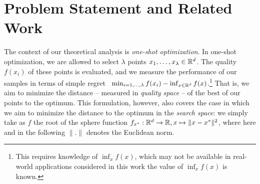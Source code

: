 \section{Problem Statement and Related Work}\label{statement}
\label{sec:basics}
The context of our {theoretical analysis} is \textit{one-shot optimization}. In one-shot optimization, we are allowed to select $\lambda$ points $x_1, \ldots, x_{\lambda} \in \mathbb{R}^d$. The quality $f(x_i)$ of these points is evaluated, and we measure the performance of our samples in terms of simple regret~\cite{bubeck2009pure} 
$\min_{i=1, \ldots,\lambda}f(x_i)-\inf_{x \in \mathbb{R}^d} f(x)$.\footnote{This requires knowledge of $\inf_{x} f(x)$, which may not be available in real-world  applications considered in this work the value of $\inf_x f(x)$ is known.} That is, we aim to minimize the distance -- measured in \textit{quality space} -- of the best of our points to the optimum. This formulation, however, also covers the case in which we aim to minimize the distance to the optimum in the \textit{search space}: we simply take as $f$ the root of the sphere function $f_{x^*}: \mathbb{R}^d \to \mathbb{R}, x \mapsto \lVert x - x^*\rVert^2$, where here and in the following $\lVert .\rVert$ denotes the Euclidean norm. 
